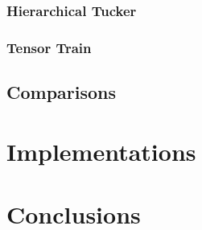 \documentclass[10pt]{article}
\begin{document}
\subsubsection{Hierarchical Tucker}
\subsubsection{Tensor Train}
\subsection{Comparisons}
\section{Implementations}

\section{Conclusions} \label{sec:conclusions}



 



\end{document}
